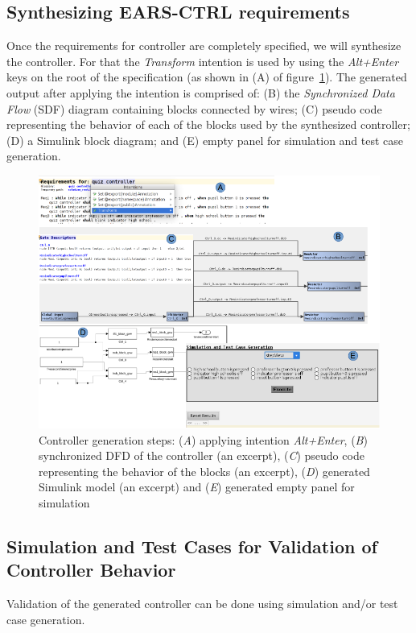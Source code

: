 \subsection{Synthesizing \textsf{EARS-CTRL} requirements}
\label{SynthReq}
\vspace{-.1cm}
Once the requirements for controller are completely specified, we will
synthesize the controller. For that the \emph{Transform} intention is used
by using the \emph{Alt+Enter} keys on the root of the specification (as shown in
(A) of figure~\ref{fig:Spec_transform}). The generated output after applying the
intention is comprised of: (B) the \emph{Synchronized Data Flow} (SDF) diagram
containing blocks connected by wires; (C) pseudo code representing the behavior
of each of the blocks used by the synthesized controller; (D) a Simulink block
diagram; and (E) empty panel for simulation and test case generation.
\begin{figure}[!h]
\centering
\includegraphics[width=1\textwidth]{./images/Transform.png}
\caption{Controller generation steps: (\emph{A}) applying intention \emph{Alt+Enter},
(\emph{B}) synchronized DFD of the controller (an excerpt), (\emph{C}) pseudo
code representing the behavior of the blocks (an excerpt), (\emph{D})
generated Simulink model (an excerpt) and (\emph{E})
generated empty panel for simulation}
\label{fig:Spec_transform}
\end{figure}
\vspace{-.2cm}
\subsection{Simulation and Test Cases for Validation of Controller
Behavior}
\vspace{-.1cm}
Validation of the generated controller can be done using simulation and/or
test case generation.
\vspace{-.3cm}
